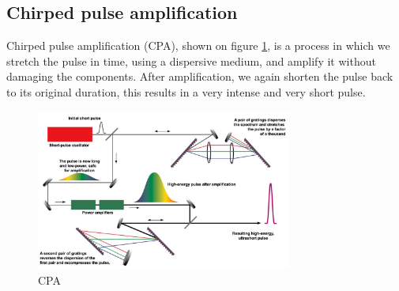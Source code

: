 \subsection{Chirped pulse amplification}


Chirped pulse amplification (CPA), shown on figure \ref{fig:cpa}, is a process in which we stretch the pulse in time, using a dispersive medium, 
and amplify it without damaging the components. After amplification, we again shorten the pulse back to its 
original duration, this results in a very intense and very short pulse. 

\begin{figure}[h!]
    \centering
    \includegraphics[width=0.75\textwidth]{slike/cpa.png}
    \caption{CPA}
    \label{fig:cpa}
\end{figure}

\section*{}